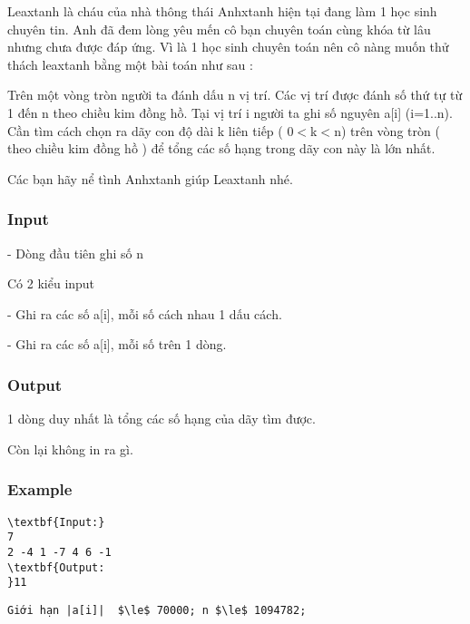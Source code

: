 

Leaxtanh là cháu của nhà thông thái Anhxtanh hiện tại đang làm 1 học sinh chuyên tin. Anh đã đem lòng yêu mến cô bạn chuyên toán cùng khóa từ lâu nhưng chưa được đáp ứng. Vì là 1 học sinh chuyên toán nên cô nàng muốn thử thách leaxtanh bằng một bài toán như sau :

Trên một vòng tròn người ta đánh dấu n vị trí. Các vị trí được đánh số thứ tự từ 1 đến n theo chiều kim đồng hồ. Tại vị trí i người ta ghi số nguyên a[i] (i=1..n). Cần tìm cách chọn ra dãy con độ dài k liên tiếp ( 0$<$k$<$n) trên vòng tròn ( theo chiều kim đồng hồ ) để tổng các số hạng trong dãy con này là lớn nhất.

Các bạn hãy nể tình Anhxtanh giúp Leaxtanh nhé.

\subsubsection{Input}

- Dòng đầu tiên ghi số n

Có 2 kiểu input

- Ghi ra các số a[i], mỗi số cách nhau 1 dấu cách.

- Ghi ra các số a[i], mỗi số trên 1 dòng.

\subsubsection{Output}

1 dòng duy nhất là tổng các số hạng của dãy tìm được.

Còn lại không in ra gì.

\subsubsection{Example}
\begin{verbatim}
\textbf{Input:}
7
2 -4 1 -7 4 6 -1
\textbf{Output:
}11\end{verbatim}
\begin{verbatim}
Giới hạn |a[i]|  $\le$ 70000; n $\le$ 1094782;\end{verbatim}
